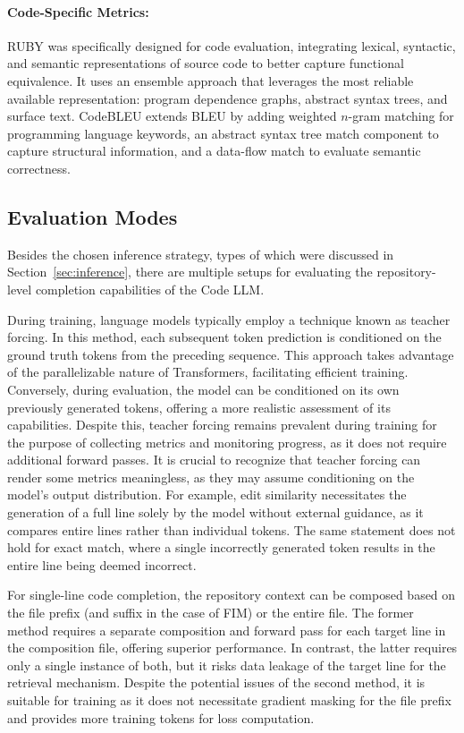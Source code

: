 \paragraph{Code-Specific Metrics:} RUBY \parencite{tran2019} was specifically designed for code evaluation, integrating lexical, syntactic, and semantic representations of source code to better capture functional equivalence. It uses an ensemble approach that leverages the most reliable available representation: program dependence graphs, abstract syntax trees, and surface text. CodeBLEU \parencite{ren2020} extends BLEU by adding weighted \(n\)-gram matching for programming language keywords, an abstract syntax tree match component to capture structural information, and a data-flow match to evaluate semantic correctness.

\subsection{Evaluation Modes}

Besides the chosen inference strategy, types of which were discussed in Section~\ref{sec:inference}, there are multiple setups for evaluating the repository-level completion capabilities of the Code LLM.

During training, language models typically employ a technique known as teacher forcing. In this method, each subsequent token prediction is conditioned on the ground truth tokens from the preceding sequence. This approach takes advantage of the parallelizable nature of Transformers, facilitating efficient training. Conversely, during evaluation, the model can be conditioned on its own previously generated tokens, offering a more realistic assessment of its capabilities. Despite this, teacher forcing remains prevalent during training for the purpose of collecting metrics and monitoring progress, as it does not require additional forward passes. It is crucial to recognize that teacher forcing can render some metrics meaningless, as they may assume conditioning on the model's output distribution. For example, edit similarity necessitates the generation of a full line solely by the model without external guidance, as it compares entire lines rather than individual tokens. The same statement does not hold for exact match, where a single incorrectly generated token results in the entire line being deemed incorrect.

For single-line code completion, the repository context can be composed based on the file prefix (and suffix in the case of FIM) or the entire file. The former method requires a separate composition and forward pass for each target line in the composition file, offering superior performance. In contrast, the latter requires only a single instance of both, but it risks data leakage of the target line for the retrieval mechanism. Despite the potential issues of the second method, it is suitable for training as it does not necessitate gradient masking for the file prefix and provides more training tokens for loss computation.

